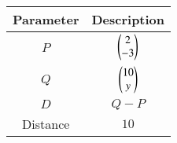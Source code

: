 \begin{tabular}[12pt]{ |c| c|}
    \hline
    Parameter & Description\\ 
    \hline
    $P$ & $\begin{pmatrix}2\\-3\end{pmatrix}$ \\
    \hline 
    $Q$ & $\begin{pmatrix}10\\y\end{pmatrix}$ \\
    \hline
    $D$ & $Q-P$\\
    \hline 
    Distance & $10$ \\
    \hline
    \end{tabular}
